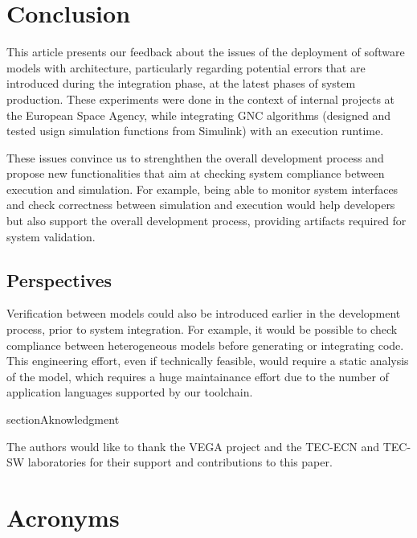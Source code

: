\documentclass[10pt, conference, compsocconf]{IEEEtran}
\begin{document}
\section{Conclusion}
This article presents our feedback about the issues of the deployment
of software models with architecture, particularly regarding potential
errors that are introduced during the integration phase, at the latest
phases of system production. These experiments were done in the context
of internal projects at the European Space Agency, while integrating
GNC algorithms (designed and tested usign simulation functions
from Simulink) with an execution runtime.

These issues convince us to strenghthen the overall development process
and propose new functionalities that aim at checking system compliance
between execution and simulation. For example, being able to monitor system
interfaces and check correctness between simulation and execution
would help developers but also support the overall development process,
providing artifacts required for system validation.

   \subsection{Perspectives}
   Verification between models could also be introduced earlier in the
   development process, prior to system integration. For example, it would be
   possible to check compliance between heterogeneous models before generating 
   or integrating code. This engineering effort, even if technically feasible, would
   require a static analysis of the model, which requires a huge
   maintainance effort due to the number of application languages supported by our
   toolchain.

\*section{Aknowledgment} 

The authors would like to thank the VEGA project and the TEC-ECN and TEC-SW laboratories for their support and contributions to this paper. 

\section*{Acronyms}
\begin{acronym}
\end{acronym}
\end{document}
